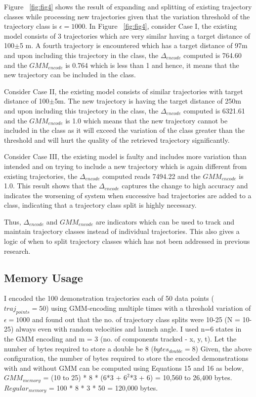 \documentclass[conference]{IEEEtran}
\begin{document}
Figure ~\ref{fig:fig4} shows the result of expanding and splitting of existing trajectory classes while processing new trajectories given that the variation threshold of the trajectory class is $\epsilon=1000$. In Figure ~\ref{fig:fig4}, consider Case I, the existing model consists of 3 trajectories which are very similar having a target distance of 100$\pm$5 m. A fourth trajectory is encountered which has a target distance of 97m and upon including this trajectory in the class, the $\Delta_{encode}$ computed is 764.60 and the $GMM_{encode}$ is 0.764 which is less than 1 and hence, it means that the new trajectory can be included in the class.

Consider Case II, the existing model consists of similar trajectories with target distance of 100$\pm$5m. The new trajectory is having the target distance of 250m and upon including this trajectory in the class, the $\Delta_{encode}$ computed is 6321.61 and the $GMM_{encode}$ is 1.0 which means that the new trajectory cannot be included in the class as it will exceed the variation of the class greater than the threshold and will hurt the quality of the retrieved trajectory significantly.

Consider Case III, the existing model is faulty and includes more variation than intended and on trying to include a new trajectory which is again different from existing trajectories, the $\Delta_{encode}$ computed reads 7494.22 and the $GMM_{encode}$ is 1.0. This result shows that the $\Delta_{encode}$ captures the change to high accuracy and indicates the worsening of system when successive bad trajectories are added to a class, indicating that a trajectory class split is highly necessary. 

Thus, $\Delta_{encode}$ and $GMM_{encode}$ are indicators which can be used to track and maintain trajectory classes instead of individual trajectories. This also gives a logic of when to split trajectory classes which has not been addressed in previous research.

\subsection{Memory Usage}
I encoded the 100 demonstration trajectories each of 50 data points ($traj_{points}=50$) using GMM-encoding multiple times with a threshold variation of $\epsilon = 1000$ and found out that the no. of trajectory class splits were 10-25 (N = 10-25) always even with random velocities and launch angle. I used n=6 states in the GMM encoding and m = 3 (no. of components tracked - x, y, t). Let the number of bytes required to store a double be 8 ($bytes_{double} = 8$) 
Given, the above configuration, the number of bytes required to store the encoded demonstrations with and without GMM can be computed using Equations 15 and 16 as below,\\
$GMM_{memory}$ = (10 to 25) * 8 * (6*3 + $6^{2}$*3 + 6) = 10,560 to 26,400 bytes.\\
$Regular_{memory}$ = 100 * 8 * 3 * 50 = 120,000 bytes.
\end{document}
